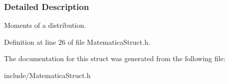 \subsubsection{\-Detailed \-Description}
\-Moments of a distribution. 

\-Definition at line 26 of file \-Matematica\-Struct.\-h.



\-The documentation for this struct was generated from the following file\-:\begin{DoxyCompactItemize}
\item 
include/\-Matematica\-Struct.\-h\end{DoxyCompactItemize}
